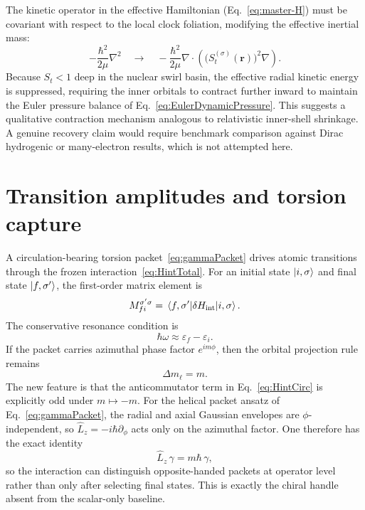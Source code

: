 \documentclass[11pt,a4paper]{article}
\begin{document}
        The kinetic operator in the effective Hamiltonian (Eq.~\eqref{eq:master-H}) must be covariant with respect to the local clock foliation, modifying the effective inertial mass:
        \begin{equation}
            \label{eq:Hkin_HighZ}
            -\frac{\hbar^2}{2\mu}\nabla^2 \quad \longrightarrow \quad -\frac{\hbar^2}{2\mu} \nabla \cdot \left( \bigl(S_t^{(\sigma)}(\mathbf r)\bigr)^2 \nabla \right).
        \end{equation}
        Because $S_t < 1$ deep in the nuclear swirl basin, the effective radial kinetic energy is suppressed, requiring the inner orbitals to contract further inward to maintain the Euler pressure balance of Eq.~\eqref{eq:EulerDynamicPressure}. This suggests a qualitative contraction mechanism analogous to relativistic inner-shell shrinkage. A genuine recovery claim would require benchmark comparison against Dirac hydrogenic or many-electron results, which is not attempted here.
    
    \section{Transition amplitudes and torsion capture}
    \label{sec:transition-amplitudes}
    A circulation-bearing torsion packet~\eqref{eq:gammaPacket} drives atomic transitions through the frozen interaction~\eqref{eq:HintTotal}. For an initial state $\ket{i,\sigma}$ and final state $\ket{f,\sigma'}$, the first-order matrix element is
    \begin{equation}
        \label{eq:Mfi}
        M_{fi}^{\sigma'\sigma}=\matrixel{f,\sigma'}{\delta H_{\rm int}}{i,\sigma}.
    \end{equation}
    The conservative resonance condition is
    \begin{equation}
        \label{eq:resonance}
        \hbar\omega \approx \varepsilon_f-\varepsilon_i.
    \end{equation}
    If the packet carries azimuthal phase factor $e^{im\phi}$, then the orbital projection rule remains
    \begin{equation}
        \label{eq:dm}
        \Delta m_\ell = m.
    \end{equation}
    The new feature is that the anticommutator term in Eq.~\eqref{eq:HintCirc} is explicitly odd under $m\mapsto -m$. For the helical packet ansatz of Eq.~\eqref{eq:gammaPacket}, the radial and axial Gaussian envelopes are $\phi$-independent, so $\hat L_z=-i\hbar\partial_\phi$ acts only on the azimuthal factor. One therefore has the exact identity
    \begin{equation}
        \label{eq:Lzgamma}
        \hat L_z\,\gamma = m\hbar\,\gamma,
    \end{equation}
    so the interaction can distinguish opposite-handed packets at operator level rather than only after selecting final states. This is exactly the chiral handle absent from the scalar-only baseline.
    
\end{document}
